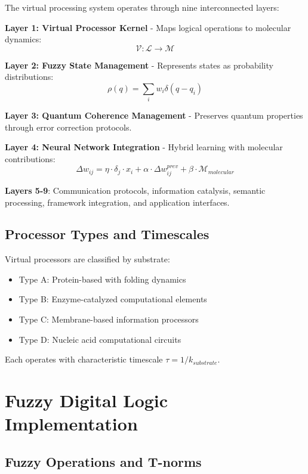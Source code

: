 \documentclass[12pt]{article}
\begin{document}
The virtual processing system operates through nine interconnected layers:

\textbf{Layer 1: Virtual Processor Kernel} - Maps logical operations to molecular dynamics:
\begin{equation}
\mathcal{V}: \mathcal{L} \rightarrow \mathcal{M}
\end{equation}

\textbf{Layer 2: Fuzzy State Management} - Represents states as probability distributions:
\begin{equation}
\rho(q) = \sum_i w_i \delta(q - q_i)
\end{equation}

\textbf{Layer 3: Quantum Coherence Management} - Preserves quantum properties through error correction protocols.

\textbf{Layer 4: Neural Network Integration} - Hybrid learning with molecular contributions:
\begin{equation}
\Delta w_{ij} = \eta \cdot \delta_j \cdot x_i + \alpha \cdot \Delta w_{ij}^{prev} + \beta \cdot \mathcal{M}_{molecular}
\end{equation}

\textbf{Layers 5-9}: Communication protocols, information catalysis, semantic processing, framework integration, and application interfaces.

\subsection{Processor Types and Timescales}

Virtual processors are classified by substrate:
\begin{itemize}
\item Type A: Protein-based with folding dynamics
\item Type B: Enzyme-catalyzed computational elements  
\item Type C: Membrane-based information processors
\item Type D: Nucleic acid computational circuits
\end{itemize}

Each operates with characteristic timescale $\tau = 1/k_{substrate}$.

\section{Fuzzy Digital Logic Implementation}

\subsection{Fuzzy Operations and T-norms}
\end{document}

